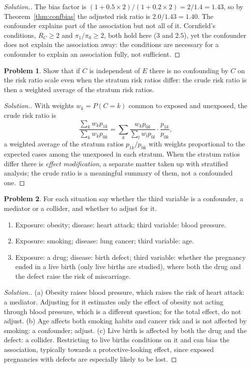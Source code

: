 \documentclass[11pt,a4paper]{article}
\numberwithin{equation}{section}
\theoremstyle{definition}
\newtheorem{problemx}{Problem}[subsection]
\newenvironment{problem}{\begin{problemx}}{\end{problemx}}
\newenvironment{solution}
  {\renewcommand{\qedsymbol}{}\begin{proof}[\textit{Solution}.]}
  {\end{proof}}
\begin{document}
\begin{solution}
The bias factor is $(1 + 0.5 \times 2)/(1 + 0.2 \times 2) = 2/1.4 = 1.43$, so by Theorem~\ref{thm:confbias} the adjusted risk ratio is $2.0/1.43 = 1.40$. The confounder
explains part of the association but not all of it. Cornfield's conditions, $R_C \geq 2$ and $\pi_1/\pi_0 \geq 2$, both hold here ($3$ and $2.5$), yet
the confounder does not explain the association away: the conditions are necessary for a confounder to explain an association
fully, not sufficient.
\end{solution}

\begin{problem}
Show that if $C$ is independent of $E$ there is no confounding by $C$ on the risk ratio scale even when the stratum risk ratios differ: the crude
risk ratio is then a weighted average of the stratum risk ratios.
\end{problem}

\begin{solution}
With weights $w_k = P(C = k)$ common to exposed and unexposed, the crude risk ratio is
\[
\frac{\sum_k w_k p_{1k}}{\sum_k w_k p_{0k}} = \sum_k \frac{w_k p_{0k}}{\sum_l w_l p_{0l}} \cdot \frac{p_{1k}}{p_{0k}} ,
\]
a weighted average of the stratum ratios $p_{1k}/p_{0k}$ with weights proportional to the expected cases among the unexposed in each stratum. When
the stratum ratios differ there is \emph{effect modification}, a separate matter taken up with stratified analysis; the crude
ratio is a meaningful summary of them, not a confounded one.
\end{solution}

\begin{problem}
For each situation say whether the third variable is a confounder, a mediator or a collider, and whether to adjust for it.
\begin{enumerate}[label=(\alph*)]
\item Exposure: obesity; disease: heart attack; third variable: blood pressure.
\item Exposure: smoking; disease: lung cancer; third variable: age.
\item Exposure: a drug; disease: birth defect; third variable: whether the pregnancy ended in a live birth (only live births are studied),
where both the drug and the defect raise the risk of miscarriage.
\end{enumerate}
\end{problem}

\begin{solution}
(a) Obesity raises blood pressure, which raises the risk of heart attack: a mediator. Adjusting for it estimates only the effect of
obesity not acting through blood pressure, which is a different question; for the total effect, do not adjust.
(b) Age affects both smoking habits and cancer risk and is not affected by smoking: a confounder; adjust.
(c) Live birth is affected by both the drug and the defect: a collider. Restricting to live births conditions on it and can bias the
association, typically towards a protective-looking effect, since exposed pregnancies with defects are especially likely to be lost.
\end{solution}
\end{document}
